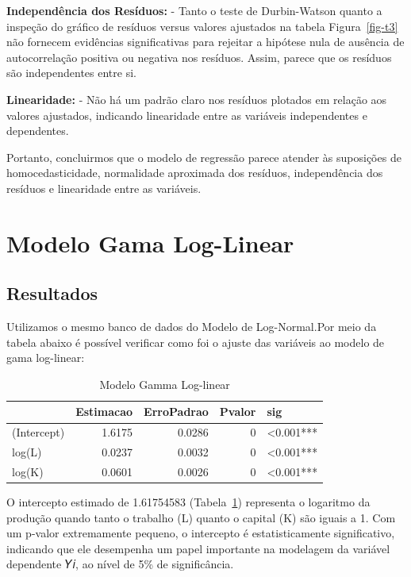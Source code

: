\documentclass[
  letterpaper,
  DIV=11,
  numbers=noendperiod]{scrreprt}
\begin{document}
\textbf{Independência dos Resíduos:} - Tanto o teste de Durbin-Watson
quanto a inspeção do gráfico de resíduos versus valores ajustados na
tabela Figura~\ref{fig-t3} não fornecem evidências significativas para
rejeitar a hipótese nula de ausência de autocorrelação positiva ou
negativa nos resíduos. Assim, parece que os resíduos são independentes
entre si.

\textbf{Linearidade:} - Não há um padrão claro nos resíduos plotados em
relação aos valores ajustados, indicando linearidade entre as variáveis
independentes e dependentes.

Portanto, concluirmos que o modelo de regressão parece atender às
suposições de homocedasticidade, normalidade aproximada dos resíduos,
independência dos resíduos e linearidade entre as variáveis.

\section{Modelo Gama Log-Linear}\label{modelo-gama-log-linear}

\subsection{Resultados}\label{resultados-1}

Utilizamos o mesmo banco de dados do Modelo de Log-Normal.Por meio da
tabela abaixo é possível verificar como foi o ajuste das variáveis ao
modelo de gama log-linear:

\begin{longtable}[]{@{}lrrrl@{}}

\caption{\label{tbl-gama2}Modelo Gamma Log-linear}

\tabularnewline

\toprule\noalign{}
& Estimacao & ErroPadrao & Pvalor & sig \\
\midrule\noalign{}
\endhead
\bottomrule\noalign{}
\endlastfoot
(Intercept) & 1.6175 & 0.0286 & 0 & \textless0.001*** \\
log(L) & 0.0237 & 0.0032 & 0 & \textless0.001*** \\
log(K) & 0.0601 & 0.0026 & 0 & \textless0.001*** \\

\end{longtable}

O intercepto estimado de 1.61754583 (Tabela~\ref{tbl-gama2}) representa
o logaritmo da produção quando tanto o trabalho (L) quanto o capital (K)
são iguais a 1. Com um p-valor extremamente pequeno, o intercepto é
estatisticamente significativo, indicando que ele desempenha um papel
importante na modelagem da variável dependente 𝑌𝑖, ao nível de 5\% de
significância.
\end{document}
